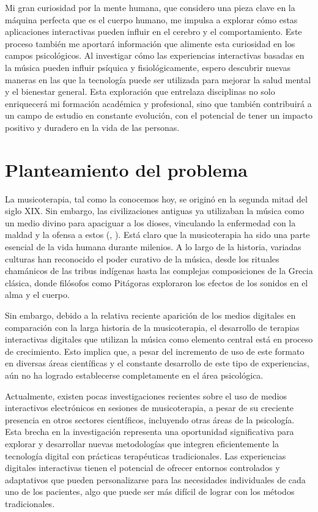 Mi gran curiosidad por la mente humana, que considero una pieza clave en la máquina perfecta que es el cuerpo humano, me impulsa a explorar cómo estas aplicaciones interactivas pueden influir en el cerebro y el comportamiento. Este proceso también me aportará información que alimente esta curiosidad en los campos psicológicos. Al investigar cómo las experiencias interactivas basadas en la música pueden influir psíquica y fisiológicamente, espero descubrir nuevas maneras en las que la tecnología puede ser utilizada para mejorar la salud mental y el bienestar general. Esta exploración que entrelaza disciplinas no solo enriquecerá mi formación académica y profesional, sino que también contribuirá a un campo de estudio en constante evolución, con el potencial de tener un impacto positivo y duradero en la vida de las personas.

\section{Planteamiento del problema}

La musicoterapia, tal como la conocemos hoy, se originó en la segunda mitad del siglo XIX. Sin embargo, las civilizaciones antiguas ya utilizaban la música como un medio divino para apaciguar a los dioses, vinculando la enfermedad con la maldad y la ofensa a estos (\citeauthor{JIPS:2001}, \citeyear{JIPS:2001}). Está claro que la musicoterapia ha sido una parte esencial de la vida humana durante milenios. A lo largo de la historia, variadas culturas han reconocido el poder curativo de la música, desde los rituales chamánicos de las tribus indígenas hasta las complejas composiciones de la Grecia clásica, donde filósofos como Pitágoras exploraron los efectos de los sonidos en el alma y el cuerpo.

Sin embargo, debido a la relativa reciente aparición de los medios digitales en comparación con la larga historia de la musicoterapia, el desarrollo de terapias interactivas digitales que utilizan la música como elemento central está en proceso de crecimiento. Esto implica que, a pesar del incremento de uso de este formato en diversas áreas científicas y el constante desarrollo de este tipo de experiencias, aún no ha logrado establecerse completamente en el área psicológica.

Actualmente, existen pocas investigaciones recientes sobre el uso de medios interactivos electrónicos en sesiones de musicoterapia, a pesar de su creciente presencia en otros sectores científicos, incluyendo otras áreas de la psicología. Esta brecha en la investigación representa una oportunidad significativa para explorar y desarrollar nuevas metodologías que integren eficientemente la tecnología digital con prácticas terapéuticas tradicionales. Las experiencias digitales interactivas tienen el potencial de ofrecer entornos controlados y adaptativos que pueden personalizarse para las necesidades individuales de cada uno de los pacientes, algo que puede ser más difícil de lograr con los métodos tradicionales.

